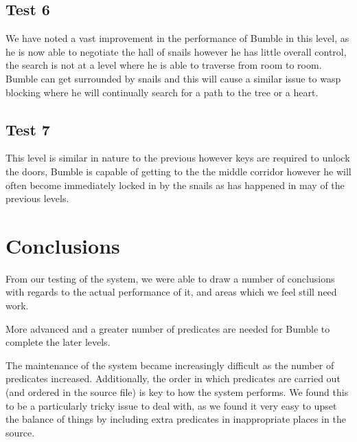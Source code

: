 \documentclass[a4paper,oneside]{report}
\begin{document}
	
	\subsection{Test 6}
	We have noted a vast improvement in the performance of Bumble in this level, as he is now able to negotiate the hall of snails however he has little overall control, the search is not at a level where he is able to traverse from room to room. Bumble can get surrounded by snails and this will cause a similar issue to wasp blocking where he will continually search for a path to the tree or a heart.
	
	
	\subsection{Test 7}
	This level is similar in nature to the previous however keys are required to unlock the doors, Bumble is capable of getting to the the middle corridor however he will often become immediately locked in by the snails as has happened in may of the previous levels. 
	
	

\section{Conclusions}

From our testing of the system, we were able to draw a number of conclusions with regards to the actual performance of it, and areas which we feel still need work.

More advanced and a greater number of predicates are needed for Bumble to complete the later levels.

The maintenance of the system became increasingly difficult as the number of predicates increased. Additionally, the order in which predicates are carried out (and ordered in the source file) is key to how the system performs. We found this to be a particularly tricky issue to deal with, as we found it very easy to upset the balance of things by including extra predicates in inappropriate places in the source.
\end{document}

